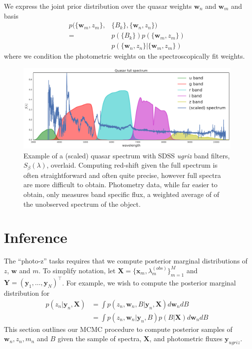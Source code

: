 \documentclass{article}
\newcommand{\trans}{\intercal}
\begin{document}
We express the joint prior distribution over the quasar weights $\mathbf{w}_n$ and $\mathbf{w}_m$ and basis 
\begin{align}
  p( \{ \mathbf{w}_m, z_m \}, &\{ B_k \}, \{ \mathbf{w}_n, z_n \} )  \\
    = & p(\{ B_k \}) p( \{ \mathbf{w}_m, z_m \} )  \\
      & p( \{ \mathbf{w}_n, z_n \} | \{ \mathbf{w}_m, z_m \} ) 
\end{align}
where we condition the photometric weights on the spectroscopically fit weights.  

\begin{figure}[ht]
\vskip 0.2in
\begin{center}
\centerline{\includegraphics[width=2\columnwidth]{../figs/quasar_spectrum_sdss_filters}}
\caption{Example of a (scaled) quasar spectrum with SDSS \emph{ugriz} band filters, $S_{\beta}(\lambda)$, overlaid.  Computing red-shift given the full spectrum is often straightforward and often quite precise, however full spectra are more difficult to obtain.  Photometry data, while far easier to obtain, only measures band specific flux, a weighted average of of the unobserved spectrum of the object. }
\label{fig:filters}
\end{center}
\vskip -0.2in
\end{figure} 

\section{Inference}
The ``photo-z'' tasks requires that we compute posterior marginal distributions of $z$, $\mathbf{w}$ and $m$.  To simplify notation, let $\mathbf{X} = \{\mathbf{x}_m, \lambda^{(obs)}_m \}_{m=1}^M$ and $\mathbf{Y} = ( \mathbf{y}_1, \dots, \mathbf{y}_N )^\trans$.   
For example, we wish to compute the posterior marginal distribution for
\begin{align}
  p(z_n | \mathbf{y}_n, \mathbf{X}) 
    &= \int p(z_n, \mathbf{w}_n, B | \mathbf{y}_n, \mathbf{X}) d\mathbf{w}_n dB \\
    &= \int p(z_n, \mathbf{w}_n | \mathbf{y}_n, B) p(B | \mathbf{X}) d\mathbf{w}_n dB
\end{align}
This section outlines our MCMC procedure to compute posterior samples of $\mathbf{w}_n, z_n, m_n$ and $B$ given the sample of spectra, $\mathbf{X}$, and photometric fluxes $\mathbf{y}_{ugriz}$.  
\end{document}
